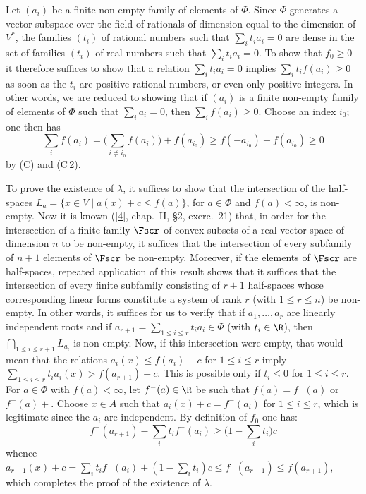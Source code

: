 \documentclass[12pt,a4paper,oneside,english]{smfart}
\makeatletter
\newcommand{\btpageanchor}[1]{\Hy@raisedlink{\hypertarget{p:#1}{}}}
\newcommand{\btbib}[1]{\hyperlink{bib:#1}{#1}}
\newcommand{\btpage}[1]{\marginnote{p.~#1}\btpageanchor{#1}}
\newcommand{\pmark}[1]{\btpage{#1}}
\theoremstyle{definition}
\theoremstyle{bt}
\makeatother
\begin{document}
Let $(a_i)$ be a finite non-empty family of elements of $\Phi$. Since
$\Phi$ generates a vector subspace over the field of rationals of dimension
equal to the dimension of $V^{*}$, the families $(t_i)$ of rational numbers
such that $\sum_i t_ia_i=0$ are dense in the set of families $(t_i)$ of
real numbers such that $\sum_i t_ia_i=0$. To show that $f_0\geq0$ it
therefore suffices to show that a relation $\sum_i t_ia_i=0$ implies
$\sum_i t_if(a_i)\geq0$ as soon as the $t_i$ are positive rational numbers,
or even only positive integers. In other words, we are reduced to showing
that if $(a_i)$ is a finite non-empty family of elements of $\Phi$ such
that $\sum_i a_i=0$, then $\sum_i f(a_i)\geq0$. Choose an index $i_0$; one
then has
\begin{equation}
  \sum_i f(a_i)=\Big(\sum_{i\neq i_0}f(a_i)\Big)+f(a_{i_0})
   \geq f(-a_{i_0})+f(a_{i_0})\geq0
\end{equation}
by (C) and (C\,2).

To prove the existence of $\lambda$, it suffices to show that the
intersection of the half-spaces $L_a=\{x\in V\mid a(x)+c\leq f(a)\}$, for
$a\in\Phi$ and $f(a)<\infty$, is non-empty. Now it is known ([\btbib{4}],
chap.~II, \S2, exerc.~21) that, in order for the intersection of a finite
family $\Fscr$ of convex subsets of a real vector space of dimension $n$ to
be non-empty, it suffices that the intersection of every subfamily of $n+1$
elements of $\Fscr$ be non-empty. Moreover, if the elements of $\Fscr$ are
half-spaces, repeated application of this result shows that it suffices
that the intersection of every finite subfamily consisting of $r+1$
half-spaces whose corresponding linear forms constitute a system of rank
$r$ (with $1\leq r\leq n$) be non-empty. In other words, it suffices for us
to verify that if $a_1,\dots,a_r$ are linearly
\pmark{135}
independent roots and if $a_{r+1}=\sum_{1\leq i\leq r}t_ia_i\in\Phi$ (with
$t_i\in\R$), then $\bigcap_{1\leq i\leq r+1}L_{a_i}$ is non-empty. Now, if
this intersection were empty, that would mean that the relations
$a_i(x)\leq f(a_i)-c$ for $1\leq i\leq r$ imply
$\sum_{1\leq i\leq r}t_ia_i(x)>f(a_{r+1})-c$. This is possible only if
$t_i\leq0$ for $1\leq i\leq r$. For $a\in\Phi$ with $f(a)<\infty$, let
$f^{-}(a)\in\R$ be such that $f(a)=f^{-}(a)$ or $f^{-}(a)+$. Choose
$x\in A$ such that $a_i(x)+c=f^{-}(a_i)$ for $1\leq i\leq r$, which is
legitimate since the $a_i$ are independent. By definition of $f_0$ one has:
\[
  f^{-}(a_{r+1})-\sum_i t_if^{-}(a_i)\geq\Big(1-\sum_i t_i\Big)c
\]
whence
$a_{r+1}(x)+c=\sum_i t_if^{-}(a_i)+(1-\sum_i t_i)c\leq f^{-}(a_{r+1})\leq
f(a_{r+1})$, which completes the proof of the existence of $\lambda$.
\end{document}
